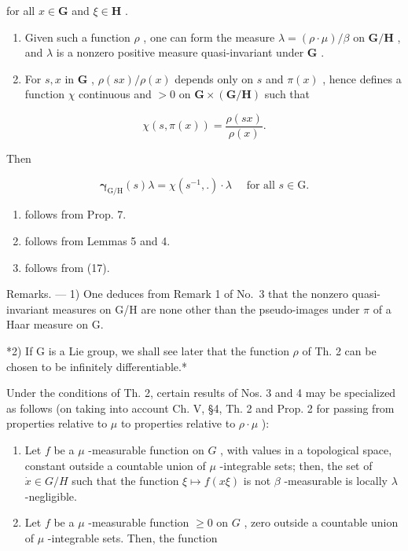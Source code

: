 for all \(x \in \mathbf{G}\) and \(\xi \in \mathbf{H}\) .

\begin{enumerate}
\def\labelenumi{\alph{enumi})}
\setcounter{enumi}{1}
\item
  Given such a function \(\rho\) , one can form the measure \(\lambda = (\rho \cdot \mu) / \beta\) on \(\mathbf{G} / \mathbf{H}\) , and \(\lambda\) is a nonzero positive measure quasi-invariant under \(\mathbf{G}\) .
\item
  For \(s, x\) in \(\mathbf{G}\) , \(\rho(sx) / \rho(x)\) depends only on \(s\) and \(\pi(x)\) , hence defines a function \(\chi\) continuous and \(>0\) on \(\mathbf{G} \times (\mathbf{G} / \mathbf{H})\) such that
\end{enumerate}

\[
\chi (s, \pi (x)) = \frac {\rho (s x)}{\rho (x)}.\tag{19}
\]

Then

\[
\boldsymbol {\gamma} _ {\mathrm{G/H}} (s) \lambda = \chi (s ^ {- 1},.) \cdot \lambda \quad \text {   for   all   } s \in \mathrm{G}.\tag{20}
\]

\begin{enumerate}
\def\labelenumi{\alph{enumi})}
\item
  follows from Prop. 7.
\item
  follows from Lemmas 5 and 4.
\item
  follows from (17).
\end{enumerate}

Remarks. --- 1) One deduces from Remark 1 of No.~3 that the nonzero quasi-invariant measures on G/H are none other than the pseudo-images under \(\pi\) of a Haar measure on G.

*2) If G is a Lie group, we shall see later that the function \(\rho\) of Th. 2 can be chosen to be infinitely differentiable.*

Under the conditions of Th. 2, certain results of Nos. 3 and 4 may be specialized as follows (on taking into account Ch. V, §4, Th. 2 and Prop. 2 for passing from properties relative to \(\mu\) to properties relative to \(\rho \cdot \mu\) ):

\begin{enumerate}
\def\labelenumi{\alph{enumi})}
\item
  Let \(f\) be a \(\mu\) -measurable function on \(G\) , with values in a topological space, constant outside a countable union of \(\mu\) -integrable sets; then, the set of \(\dot{x} \in G / H\) such that the function \(\xi \mapsto f(x\xi)\) is not \(\beta\) -measurable is locally \(\lambda\) -negligible.
\item
  Let \(f\) be a \(\mu\) -measurable function \(\geqslant 0\) on \(G\) , zero outside a countable union of \(\mu\) -integrable sets. Then, the function
\end{enumerate}

